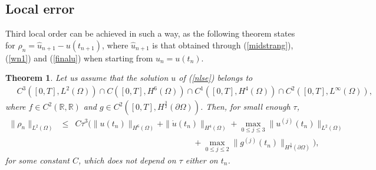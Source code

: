 \documentclass[10pt,a4paper]{amsart}
\newtheorem{theorem}{Theorem}
\begin{document}
\subsection{Local error}
Third local order can be achieved in such a way, as the following theorem states for $\rho_n=\hat{u}_{n+1}-u(t_{n+1})$, where $\hat{u}_{n+1}$ is that obtained through (\ref{midstrang}),(\ref{wn1}) and (\ref{finalu}) when starting from $u_n=u(t_n)$.

\begin{theorem}
Let us assume that the solution $u$ of (\ref{nlse}) belongs to
\begin{eqnarray}
\quad C^3([0,T], L^2(\Omega))\cap C([0,T], H^6(\Omega))  \cap C^1([0,T], H^4(\Omega)) \cap C^2([0,T],L^{\infty}(\Omega)),
\label{reg2}
\end{eqnarray}
where $f\in C^2(\mathbb{R}, \mathbb{R})$ and $g\in C^2([0,T], H^{\frac{3}{2}}(\partial \Omega))$. Then, for small enough $\tau$,
\begin{eqnarray}
\|\rho_n\|_{L^2(\Omega)} &\le& C \tau^3 (\|u(t_n)\|_{H^6(\Omega)}+\|\dot{u}(t_n)\|_{H^4(\Omega)}
+\max_{0\le j \le 3} \|u^{(j)}(t_n)\|_{L^2(\Omega)}
\nonumber \\
&&\hspace{6cm}+\max_{0\le j \le 2}\|g^{(j)}(t_n)\|_{H^{\frac{3}{2}}(\partial \Omega)}),
\label{cotaloc}
\end{eqnarray}
for some constant $C$, which does not depend on $\tau$ either on $t_n$.
\label{thloc}
\end{theorem}
\end{document}
